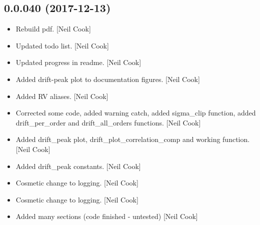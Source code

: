 \documentclass[a4paper,10pt,english]{report}
\begin{document}
\subsection{0.0.040 (2017-12-13)}
\label{\detokenize{misc/changelog:id510}}\begin{itemize}
\item {} 
Rebuild pdf. {[}Neil Cook{]}

\item {} 
Updated todo list. {[}Neil Cook{]}

\item {} 
Updated progress in readme. {[}Neil Cook{]}

\item {} 
Added drift-peak plot to documentation figures. {[}Neil Cook{]}

\item {} 
Added RV aliases. {[}Neil Cook{]}

\item {} 
Corrected some code, added warning catch, added sigma\_clip function,
added drift\_per\_order and drift\_all\_orders functions. {[}Neil Cook{]}

\item {} 
Added drift\_peak plot, drift\_plot\_correlation\_comp and working
function. {[}Neil Cook{]}

\item {} 
Added drift\_peak constants. {[}Neil Cook{]}

\item {} 
Cosmetic change to logging. {[}Neil Cook{]}

\item {} 
Cosmetic change to logging. {[}Neil Cook{]}

\item {} 
Added many sections (code finished - untested) {[}Neil Cook{]}

\end{itemize}
\end{document}
